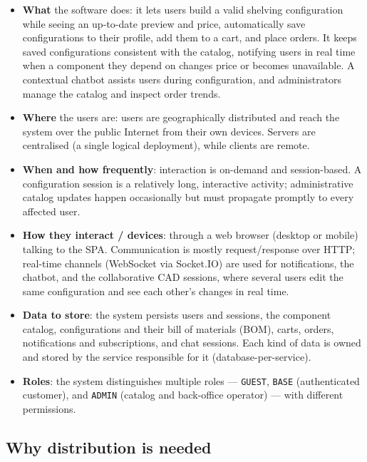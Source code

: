 \begin{itemize}
  \item \textbf{What} the software does: it lets users build a valid shelving configuration while seeing an
  up-to-date preview and price, automatically save configurations to their profile, add them
  to a cart, and place orders. It keeps saved configurations consistent with
  the catalog, notifying users in real time when a component they depend on
  changes price or becomes unavailable. A contextual chatbot assists users
  during configuration, and administrators manage the catalog and inspect
  order trends.

  \item \textbf{Where} the users are: users are geographically distributed and
  reach the system over the public Internet from their own devices. Servers are
  centralised (a single logical deployment), while clients are remote.

  \item \textbf{When and how frequently}: interaction is on-demand and
  session-based. A configuration session is a relatively long, interactive
  activity; administrative catalog updates happen occasionally but must
  propagate promptly to every affected user.

  \item \textbf{How they interact / devices}: through a web browser (desktop or
  mobile) talking to the SPA. Communication is mostly request/response over
  HTTP; real-time channels (WebSocket via Socket.IO) are used for notifications,
  the chatbot, and the collaborative CAD sessions, where several users edit the
  same configuration and see each other's changes in real time.

  \item \textbf{Data to store}: the system persists users and sessions,
  the component catalog, configurations and their bill of materials (BOM),
  carts, orders, notifications and subscriptions, and chat sessions. Each kind
  of data is owned and stored by the service responsible for it
  (database-per-service).

  \item \textbf{Roles}: the system distinguishes multiple roles ---
  \texttt{GUEST}, \texttt{BASE} (authenticated customer), and \texttt{ADMIN}
  (catalog and back-office operator) --- with different permissions.
\end{itemize}

\subsection{Why distribution is needed}

